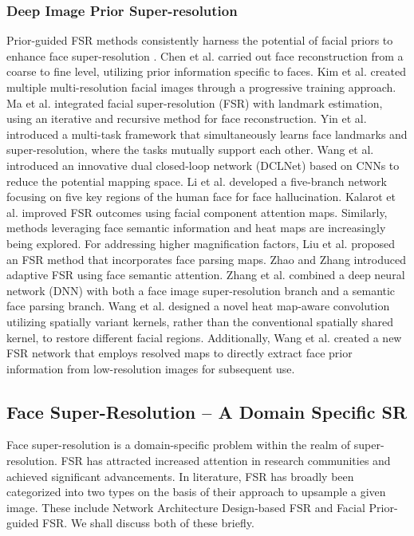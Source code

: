 \subsubsection{Deep Image Prior Super-resolution}
Prior-guided FSR methods consistently harness the potential of facial priors to enhance face super-resolution \cite{fsr21,fsr22,fsr23}. Chen et al. \cite{fsr24} carried out face reconstruction from a coarse to fine level, utilizing prior information specific to faces. Kim et al. \cite{fsr25} created multiple multi-resolution facial images through a progressive training approach. Ma et al. \cite{fsr26} integrated facial super-resolution (FSR) with landmark estimation, using an iterative and recursive method for face reconstruction. Yin et al. \cite{fsr27} introduced a multi-task framework that simultaneously learns face landmarks and super-resolution, where the tasks mutually support each other. Wang et al. \cite{fsr28} introduced an innovative dual closed-loop network (DCLNet) based on CNNs to reduce the potential mapping space. Li et al. \cite{fsr29} developed a five-branch network focusing on five key regions of the human face for face hallucination. Kalarot et al. \cite{fsr30} improved FSR outcomes using facial component attention maps. Similarly, methods leveraging face semantic information and heat maps are increasingly being explored. For addressing higher magnification factors, Liu et al. \cite{fsr31} proposed an FSR method that incorporates face parsing maps. Zhao and Zhang \cite{fsr32} introduced adaptive FSR using face semantic attention. Zhang et al. \cite{fsr33} combined a deep neural network (DNN) with both a face image super-resolution branch and a semantic face parsing branch. Wang et al. \cite{fsr34} designed a novel heat map-aware convolution utilizing spatially variant kernels, rather than the conventional spatially shared kernel, to restore different facial regions. Additionally, Wang et al. \cite{fsr35} created a new FSR network that employs resolved maps to directly extract face prior information from low-resolution images for subsequent use.
\subsection{Face Super-Resolution -- A Domain Specific SR }
Face super-resolution is a domain-specific problem within the realm of super-resolution. FSR has attracted increased attention in research communities and achieved significant advancements. In literature, FSR has broadly been categorized into two types on the basis of their approach to upsample a given image. These include Network Architecture Design-based FSR and Facial Prior-guided FSR. We shall discuss both of these briefly.\\
